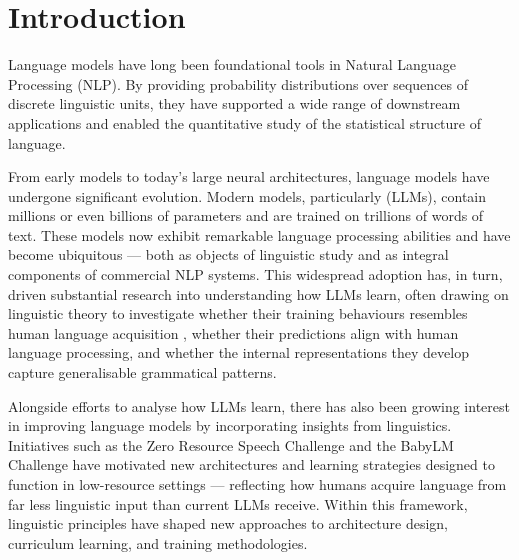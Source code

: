 \chapter{Introduction}\label{chapter:intro}


Language models have long been foundational tools in Natural Language Processing (NLP). By providing probability distributions over sequences of discrete linguistic units, they have supported a wide range of downstream applications and enabled the quantitative study of the statistical structure of language.

From early \ngram models to today's large neural architectures, language models have undergone significant evolution. Modern models, particularly  (LLMs), contain millions or even billions of parameters and are trained on trillions of words of text. These models now exhibit remarkable language processing abilities and have become ubiquitous --- both as objects of linguistic study and as integral components of commercial NLP systems. This widespread adoption has, in turn, driven substantial research into understanding how LLMs learn, often drawing on linguistic theory to investigate whether their training behaviours resembles human language acquisition \citep{evanson-2023-language}, whether their predictions align with human language processing, and whether the internal representations they develop capture generalisable grammatical patterns.

Alongside efforts to analyse how LLMs learn, there has also been growing interest in improving language models by incorporating insights from linguistics. Initiatives such as the Zero Resource Speech Challenge \citep{dunbar2022self} and the BabyLM Challenge \citep{warstadt2023findings} have motivated new architectures and learning strategies designed to function in low-resource settings --- reflecting how humans acquire language from far less linguistic input than current LLMs receive. Within this framework, linguistic principles have shaped new approaches to architecture design, curriculum learning, and training methodologies.

